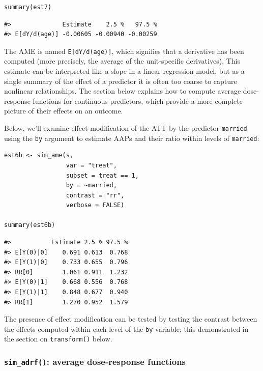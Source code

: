 \begin{verbatim}
summary(est7)
\end{verbatim}

\begin{verbatim}
#>              Estimate    2.5 %   97.5 %
#> E[dY/d(age)] -0.00605 -0.00940 -0.00259
\end{verbatim}

The AME is named \texttt{E{[}dY/d(age){]}}, which signifies that a derivative has been computed (more precisely, the average of the unit-specific derivatives). This estimate can be interpreted like a slope in a linear regression model, but as a single summary of the effect of a predictor it is often too coarse to capture nonlinear relationships. The section below explains how to compute average dose-response functions for continuous predictors, which provide a more complete picture of their effects on an outcome.

Below, we'll examine effect modification of the ATT by the predictor \texttt{married} using the \texttt{by} argument to estimate AAPs and their ratio within levels of \texttt{married}:

\begin{verbatim}
est6b <- sim_ame(s,
                 var = "treat",
                 subset = treat == 1,
                 by = ~married,
                 contrast = "rr",
                 verbose = FALSE)

summary(est6b)
\end{verbatim}

\begin{verbatim}
#>           Estimate 2.5 % 97.5 %
#> E[Y(0)|0]    0.691 0.613  0.768
#> E[Y(1)|0]    0.733 0.655  0.796
#> RR[0]        1.061 0.911  1.232
#> E[Y(0)|1]    0.668 0.556  0.768
#> E[Y(1)|1]    0.848 0.677  0.940
#> RR[1]        1.270 0.952  1.579
\end{verbatim}

The presence of effect modification can be tested by testing the contrast between the effects computed within each level of the \texttt{by} variable; this demonstrated in the section on \texttt{transform()} below.

\hypertarget{sim_adrf-average-dose-response-functions}{%
\subsubsection{\texorpdfstring{\texttt{sim\_adrf()}: average dose-response functions}{sim\_adrf(): average dose-response functions}}\label{sim_adrf-average-dose-response-functions}}

